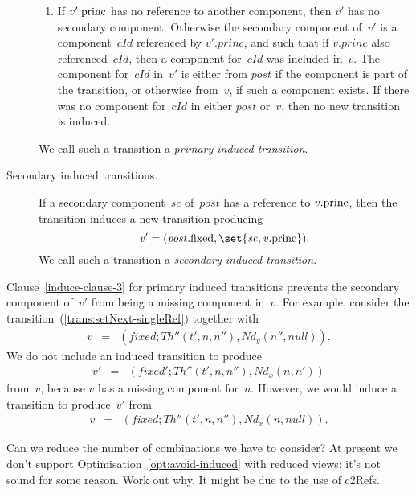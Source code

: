 \begin{definition}
\begin{description}
\begin{enumerate}
\item\label{induce-clause-3}
  If $v'.\mathrm{princ}$ has no reference to another component, then $v'$ has no
  secondary component.  Otherwise the secondary component of~$v'$ is a
  component~$cId$ referenced by $v'.princ$, and such that if $v.princ$ also
  referenced~$cId$, then a component for~$cId$ was included in~$v$.  The
  component for~$cId$ in~$v'$ is either from $post$ if the component is part
  of the transition, or otherwise from~$v$, if such a component exists.  If
  there was no component for~$cId$ in either $post$ or~$v$, then no new
  transition is induced.
\end{enumerate}
%
We call such a transition a \emph{primary induced transition}.

\item[Secondary induced transitions.]
If a secondary component~$sc$ of~$post$ has a reference to $v.\mathrm{princ}$,
then the transition induces a new transition producing
\[\mit
v' = (post.\fixed, \set{sc, v.\princ}).
\]
We call such a transition a \emph{secondary induced transition}.
\end{description}
\end{definition}


Clause~\ref{induce-clause-3} for primary induced transitions prevents the
secondary component of~$v'$ from being a missing component in~$v$.  For
example, consider the transition~(\ref{trans:setNext-singleRef}) together with
\begin{eqnarray*}
v & = & (fixed; Th''(t', n, n''), Nd_y(n'',null)) .
\end{eqnarray*}
%
We do not include an induced transition to produce
\begin{eqnarray*}
v' & = & (fixed'; Th''(t', n, n''),  Nd_x(n, n'))
\end{eqnarray*}
from~$v$, because $v$ has a missing component for~$n$.  However, we would
induce a transition to produce~$v'$ from
\begin{eqnarray*}
v & = & (fixed; Th''(t', n, n''),Nd_x(n, null) ).
\end{eqnarray*}


\begin{improve}
Can we reduce the number of combinations we have to consider?
At present we don't support Optimisation~\ref{opt:avoid-induced} with reduced
views: it's not sound for some reason.  Work out why.  It might be due to the
use of c2Refs.  
\end{improve}

